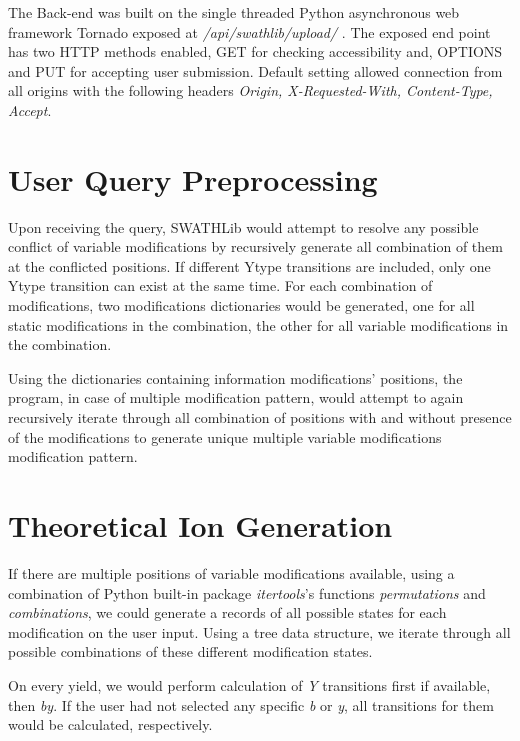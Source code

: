 \documentclass[../manual.tex]{subfiles}
\begin{document}
The Back-end was built on the single threaded Python asynchronous web framework Tornado exposed at \emph{/api/swathlib/upload/} . The exposed end point has two HTTP methods enabled, GET for checking accessibility and, OPTIONS and PUT for accepting user submission. Default setting allowed connection from all origins with the following headers \emph{Origin, X-Requested-With, Content-Type, Accept}.

\section{User Query Preprocessing}
Upon receiving the query, SWATHLib would attempt to resolve any possible conflict of variable modifications by recursively generate all combination of them at the conflicted positions. If different Ytype transitions are included, only one Ytype transition can exist at the same time. For each combination of modifications, two modifications dictionaries would be generated, one for all static modifications in the combination, the other for all variable modifications in the combination.\par

Using the dictionaries containing information modifications' positions, the program, in case of multiple modification pattern, would attempt to again recursively iterate through all combination of positions with and without presence of the modifications to generate unique multiple variable modifications modification pattern.  

\section{Theoretical Ion Generation}
If there are multiple positions of variable modifications available, using a combination of Python built-in package \emph{itertools}'s functions \emph{permutations} and \emph{combinations}, we could generate a records of all possible states for each modification on the user input. Using a tree data structure, we iterate through all possible combinations of these different modification states.\par

On every yield, we would perform calculation of \emph{Y} transitions first if available, then \emph{by}. If the user had not selected any specific \emph{b} or \emph{y}, all transitions for them would be calculated, respectively. 
\end{document}
